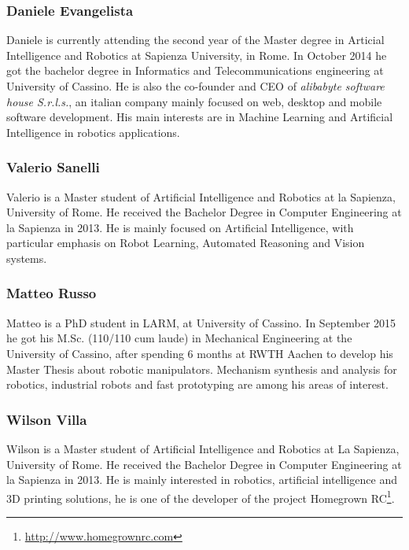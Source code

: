 \documentclass{llncs}
\begin{document}
\subsubsection*{Daniele Evangelista}
Daniele is currently attending the second year of the Master degree in Articial Intelligence and Robotics at Sapienza University, in Rome. 
In October 2014 he got the bachelor degree in Informatics and Telecommunications engineering at University of Cassino. 
He is also the co-founder and CEO of \emph{alibabyte software house S.r.l.s.}, an italian company mainly focused on web, desktop and mobile 
software development. His main interests are in Machine Learning and Artificial Intelligence in robotics applications.

\subsubsection*{Valerio Sanelli}
Valerio is a Master student of Artificial Intelligence and Robotics at la Sapienza, University of Rome.
He received the Bachelor Degree in Computer Engineering at la Sapienza in 2013.
He is mainly focused on Artificial Intelligence, with particular  emphasis on Robot Learning, Automated Reasoning and Vision systems.

\subsubsection*{Matteo Russo}
Matteo is a PhD student in LARM, at University of Cassino. In September 2015 he got his M.Sc. (110/110 cum laude) in Mechanical Engineering 
at the University of Cassino, after spending 6 months at RWTH Aachen to develop his Master Thesis about robotic manipulators. 
Mechanism synthesis and analysis for robotics, industrial robots and fast prototyping are among his areas of interest.

\subsubsection*{Wilson Villa}
Wilson is a Master student of Artificial Intelligence and Robotics at La Sapienza, University of Rome. 
He received the Bachelor Degree in Computer Engineering at la Sapienza in 2013. 
He is mainly interested in robotics, artificial intelligence and 3D printing solutions, he is one of the developer 
of the project Homegrown RC\footnote{\url{http://www.homegrownrc.com}}.
\end{document}
